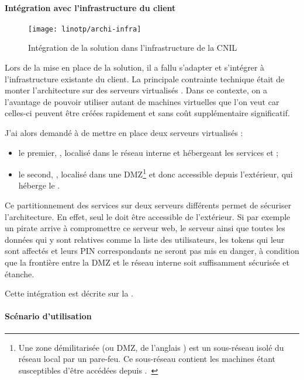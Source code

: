 \paragraph{Intégration avec l'infrastructure du client}

\begin{figure}
	\centering
	\texttt{[image: linotp/archi-infra]}
	\caption{Intégration de la solution \alinotp{} dans l'infrastructure de la CNIL}
	\label{figure:linotp:archi-infra}
\end{figure}

Lors de la mise en place de la solution, il a fallu s'adapter et s'intégrer à l'infrastructure existante du client.
La principale contrainte technique était de monter l'architecture sur des serveurs virtualisés \alinux{} \aredhat{}.
Dans ce contexte, on a l'avantage de pouvoir utiliser autant de machines virtuelles que l'on veut car celles-ci peuvent être créées rapidement et sans coût supplémentaire significatif.

J'ai alors demandé à \amimiette{} de mettre en place deux serveurs virtualisés \aredhat{} :
\begin{itemize}
	\item le premier, \asrvotp{}, localisé dans le réseau interne et hébergeant les services \alinotp{} et \afreerad{} ;
	\item le second, \asrvrp, localisé dans une DMZ\footnote{Une zone démilitarisée (ou DMZ, de l'anglais ) est un sous-réseau isolé du réseau local par un pare-feu. Ce sous-réseau contient les machines étant susceptibles d'être accédées depuis \ainternet.~\cite{dmz}} et donc accessible depuis l'extérieur, qui héberge le \arp{}.
\end{itemize}

Ce partitionnement des services sur deux serveurs différents permet de sécuriser l'architecture.
En effet, seul le \arp{} doit être accessible de l'extérieur.
Si par exemple un pirate arrive à compromettre ce serveur web, le serveur \alinotp{} ainsi que toutes les données qui y sont relatives comme la liste des utilisateurs, les tokens qui leur sont affectés et leurs PIN correspondants ne seront pas mis en danger, à condition que la frontière entre la DMZ et le réseau interne soit suffisamment sécurisée et étanche.

Cette intégration est décrite sur la .

\paragraph{Scénario d'utilisation}

